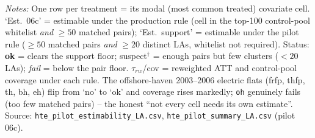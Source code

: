 \begin{landscape}
\begin{table}[htbp]
\begin{tabular}{llrrrccccrr}
\bottomrule
\end{tabular}
\begin{minipage}{0.95\textwidth}
\vspace{4pt}
\footnotesize
\textit{Notes:} One row per treatment = its modal (most common treated) covariate
cell. `Est.\ 06c' = estimable under the production rule (cell in the top-100
control-pool whitelist \emph{and} $\geq 50$ matched pairs); `Est.\ support' =
estimable under the pilot rule ($\geq 50$ matched pairs \emph{and} $\geq 20$
distinct LAs, whitelist not required). Status: \textbf{ok} = clears the support
floor; suspect$^\dagger$ = enough pairs but few clusters ($<20$ LAs); \textit{fail}
= below the pair floor. $\tau_{rw}$/cov = reweighted ATT and control-pool coverage
under each rule. The offshore-haven 2003--2006 electric flats (frfp, thfp, th, bh, eh)
flip from `no' to `ok' and coverage rises markedly; \texttt{oh} genuinely fails
(too few matched pairs) -- the honest ``not every cell needs its own estimate''.
Source: \texttt{hte\_pilot\_estimability\_LA.csv}, \texttt{hte\_pilot\_summary\_LA.csv} (pilot 06c).
\end{minipage}
\end{table}
\end{landscape}
